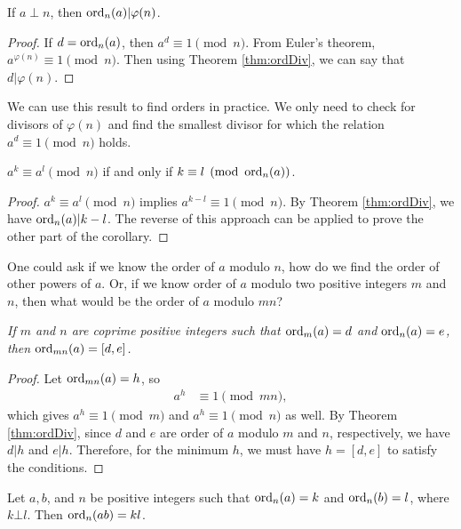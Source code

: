 \documentclass{subfile}
\begin{document}
	\begin{corollary}\label{cor:phiDiv}
		If $a\perp n$, then $\operatorname{ord}_n(a)|\varphi (n)$.
	\end{corollary}

	\begin{proof}
		If $d=\operatorname{ord}_n(a)$, then $a^d\equiv1\pmod n$. From Euler's theorem, $a^{\varphi (n)}\equiv1\pmod n$. Then using Theorem \ref{thm:ordDiv}, we can say that $d|\varphi (n)$.
	\end{proof}
We can use this result to find orders in practice. We only need to check for divisors of $\varphi(n)$ and find the smallest divisor for which the relation $a^d\equiv1\pmod n$ holds.
	\begin{corollary}
		$a^k\equiv a^l\pmod n$ if and only if $k\equiv l\pmod{\operatorname{ord}_n(a)}$.
	\end{corollary}

	\begin{proof}
		$a^k\equiv a^l\pmod n$ implies $a^{k-l} \equiv 1 \pmod n$. By Theorem \ref{thm:ordDiv}, we have $\operatorname{ord}_n(a) | k-l$. The reverse of this approach can be applied to prove the other part of the corollary.
	\end{proof}
One could ask if we know the order of $a$ modulo $n$, how do we find the order of other powers of $a$. Or, if we know order of $a$ modulo two positive integers $m$ and $n$, then what would be the order of $a$ modulo $mn$?
	\begin{theorem}\slshape
		If $m$ and $n$ are coprime positive integers such that $\operatorname{ord}_m(a)=d$ and $\operatorname{ord}_n(a)=e$, then $\operatorname{ord}_{mn}(a)=[d,e]$.\label{thm:ordL}
	\end{theorem}

	\begin{proof}
		Let $\operatorname{ord}_{mn}(a)=h$, so
			\begin{align*}
				a^h
					& \equiv1\pmod {mn},
			\end{align*}
		which gives $a^h\equiv1\pmod m$ and $a^h\equiv1\pmod n$ as well. By Theorem \ref{thm:ordDiv}, since $d$ and $e$ are order of $a$ modulo $m$ and $n$, respectively, we have $d|h$ and $e|h$. Therefore, for the minimum $h$, we must have $h=[d,e]$ to satisfy the conditions.
	\end{proof}

	\begin{theorem}\label{thm:prproduct}
		Let $a,b$, and $n$ be positive integers such that $\operatorname{ord}_n(a)=k$ and $\operatorname{ord}_n(b)=l$, where $k\bot l$. Then $\operatorname{ord}_n(ab)=kl$.
	\end{theorem}
\end{document}
